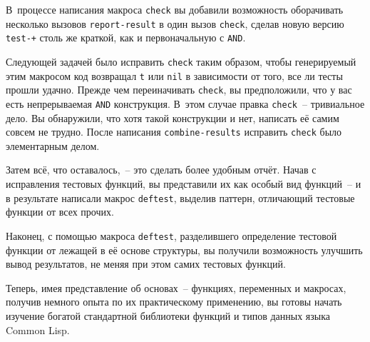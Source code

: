 В~процессе написания макроса \lstinline{check} вы добавили возможность оборачивать несколько
вызовов \lstinline{report-result} в один вызов \lstinline{check}, сделав новую версию \lstinline{test-+}
столь же краткой, как и первоначальную с \lstinline{AND}.

Следующей задачей было исправить \lstinline{check} таким образом, чтобы генерируемый этим
макросом код возвращал \lstinline{t} или \lstinline{nil} в зависимости от того, все ли тесты прошли
удачно. Прежде чем переиначивать \lstinline{check}, вы предположили, что у вас есть
непрерываемая \lstinline{AND} конструкция. В~этом случае правка \lstinline{check}~-- тривиальное
дело. Вы обнаружили, что хотя такой конструкции и нет, написать её самим совсем не
трудно. После написания \lstinline{combine-results} исправить \lstinline{check} было элементарным
делом.

Затем всё, что оставалось,~-- это сделать более удобным отчёт. Начав с исправления тестовых
функций, вы представили их как особый вид функций~-- и в результате написали макрос
\lstinline{deftest}, выделив паттерн, отличающий тестовые функции от всех прочих.

Наконец, с помощью макроса \lstinline{deftest}, разделившего определение тестовой функции от
лежащей в её основе структуры, вы получили возможность улучшить вывод результатов, не меняя
при этом самих тестовых функций.

Теперь, имея представление об основах~-- функциях, переменных и макросах, получив немного
опыта по их практическому применению, вы готовы начать изучение богатой стандартной
библиотеки функций и типов данных языка Common Lisp.

